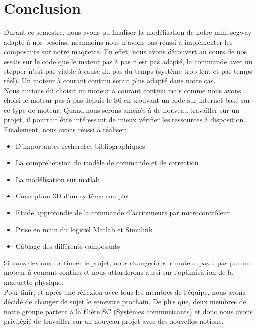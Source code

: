 \documentclass[oneside,a4paper,12pt]{article}
\begin{document}
	
	\newpage
	
	\section{Conclusion}
	Durant ce semestre, nous avons pu finaliser la modélisation de notre mini segway adapté à nos besoins, néanmoins nous n’avons pas réussi à implémenter les composants sur notre maquette. En effet, nous avons découvert au cours de nos essais sur le code que le moteur pas à pas n’est pas adapté, la commande avec un stepper n’est pas viable à cause du pas du temps (système trop lent et pas temps-réel). Un moteur à courant continu serait plus adapté dans notre cas.\\
	
	Nous aurions dû choisir un moteur à courant continu mais comme nous avons choisi le moteur pas à pas depuis le S6 en trouvant un code sur internet basé sur ce type de moteur.
	Quand nous serons amenés à de nouveau travailler sur un projet, il pourrait être intéressant de mieux vérifier les ressources à disposition.\\
	
	Finalement, nous avons réussi à réaliser:
	\begin{itemize}
		\item D’importantes recherches bibliographiques
		\item La compréhension du modèle de commande et de correction
		\item La modélisation sur matlab
		\item Conception 3D d'un système complet
		\item Etude approfondie de la commande d'actionneurs par microcontrôleur
		\item Prise en main du logiciel Matlab et Simulink
		\item Câblage des différents composants 
	\end{itemize}

	Si nous devions continuer le projet, nous changerions le moteur pas à pas par un moteur à courant continu et nous attarderons aussi sur l'optimisation de la maquette physique.\\

	Pour finir, et après une réflexion avec tous les membres de l’équipe, nous avons décidé de changer de sujet le semestre prochain. De plus que, deux membres de notre groupe partent à la filière SC (Systèmes communicants) et donc nous avons privilégié de travailler sur un nouveau projet avec des nouvelles notions.
\end{document}
